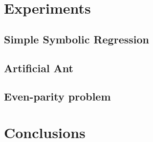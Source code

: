\documentclass[conference]{IEEEtran}
\begin{document}
\section{Experiments}

\subsection{Simple Symbolic Regression}
\subsection{Artificial Ant}
\subsection{Even-parity problem}


\section{Conclusions}
\end{document}
